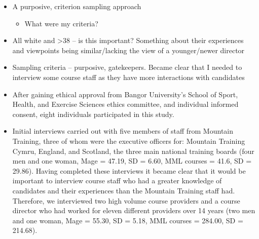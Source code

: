 \documentclass[a4paper,]{book}
\providecommand{\tightlist}{%
  \setlength{\itemsep}{0pt}\setlength{\parskip}{0pt}}
\begin{document}
\begin{itemize}
\tightlist
\item
  A purposive, criterion sampling approach

  \begin{itemize}
  \tightlist
  \item
    What were my criteria?
  \end{itemize}
\item
  All white and \textgreater{}38 -- is this important? Something about their experiences and viewpoints being similar/lacking the view of a younger/newer director
\item
  Sampling criteria -- purposive, gatekeepers. Became clear that I needed to interview some course staff as they have more interactions with candidates
\item
  After gaining ethical approval from Bangor University's School of Sport, Health, and Exercise Sciences ethics committee, and individual informed consent, eight individuals participated in this study.
\item
  Initial interviews carried out with five members of staff from Mountain Training, three of whom were the executive officers for: Mountain Training Cymru, England, and Scotland, the three main national training boards (four men and one woman, Mage = 47.19, SD = 6.60, MML courses = 41.6, SD = 29.86). Having completed these interviews it became clear that it would be important to interview course staff who had a greater knowledge of candidates and their experiences than the Mountain Training staff had. Therefore, we interviewed two high volume course providers and a course director who had worked for eleven different providers over 14 years (two men and one woman, Mage = 55.30, SD = 5.18, MML courses = 284.00, SD = 214.68).
\end{itemize}
\end{document}
